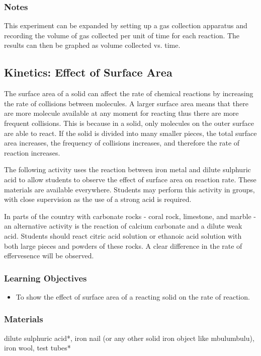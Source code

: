 \subsubsection*{Notes}
This experiment can be expanded by setting up a gas collection apparatus and recording the volume of gas collected per unit of time for each reaction. The results can then be graphed as volume collected vs. time.

\subsection{Kinetics: Effect of Surface Area}

The surface area of a solid can affect the rate of chemical reactions by increasing the rate of collisions between molecules. A larger surface area means that there are more molecule available at any moment for reacting thus there are more frequent collisions. This is because in a solid, only molecules on the outer surface are able to react. If the solid is divided into many smaller pieces, the total surface area increases, the frequency of collisions increases, and therefore the rate of reaction increases.

The following activity uses the reaction between iron metal and dilute sulphuric acid to allow students to observe the effect of surface area on reaction rate. These materials are available everywhere. Students may perform this activity in groups, with close supervision as the use of a strong acid is required.

In parts of the country with carbonate rocks - coral rock, limestone, and marble - an alternative activity is the reaction of calcium carbonate and a dilute weak acid. Students should react citric acid solution or ethanoic acid solution with both large pieces and powders of these rocks. A clear difference in the rate of effervesence will be observed.

\subsubsection*{Learning Objectives}
\begin{itemize}
\item{To show the effect of surface area of a reacting solid on the rate of reaction.}
\end{itemize}

\subsubsection*{Materials}
dilute sulphuric acid*, iron nail (or any other solid iron object like mbulumbulu), iron wool, test tubes*


